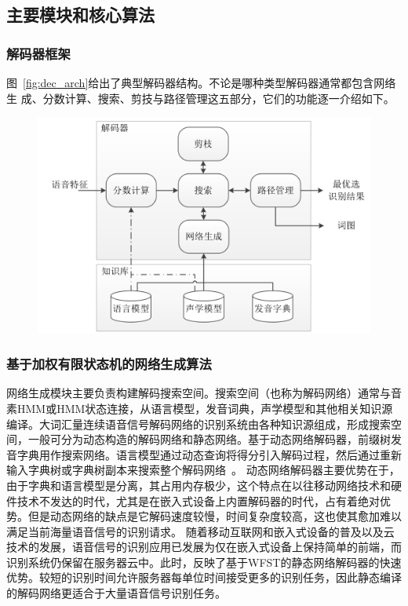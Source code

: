 \subsection{主要模块和核心算法}
\label{chap:intro-lvcsr-decmodule}

\subsubsection{解码器框架}

图~\ref{fig:dec_arch}给出了典型解码器结构。不论是哪种类型解码器通常都包含网络生
成、分数计算、搜索、剪技与路径管理这五部分，它们的功能逐一介绍如下。

\begin{figure}[!htp]
  \centering
    \captionstyle{\centering}
    \includegraphics[clip=true, width=.9\textwidth]{figure/dec_arch.png}
\end{figure}


\subsubsection{基于加权有限状态机的网络生成算法}

网络生成模块主要负责构建解码搜索空间。搜索空间（也称为解码网络）通常与音素HMM或HMM状态连接，从语言模型，发音词典，声学模型和其他相关知识源编译。大词汇量连续语音信号解码网络的识别系统由各种知识源组成，形成搜索空间，一般可分为动态构造的解码网络和静态网络。基于动态网络解码器，前缀树发音字典用作搜索网络。语言模型通过动态查询将得分引入解码过程，然后通过重新输入字典树或字典树副本来搜索整个解码网络~\cite{young2002htk}。
动态网络解码器主要优势在于，由于字典和语言模型是分离，其占用内存极少，这个特点在以往移动网络技术和硬件技术不发达的时代，尤其是在嵌入式设备上内置解码器的时代，占有着绝对优势。但是动态网络的缺点是它解码速度较慢，时间复杂度较高，这也使其愈加难以满足当前海量语音信号的识别请求。
随着移动互联网和嵌入式设备的普及以及云技术的发展，语音信号的识别应用已发展为仅在嵌入式设备上保持简单的前端，而识别系统仍保留在服务器云中。此时，反映了基于WFST的静态网络解码器的快速优势。较短的识别时间允许服务器每单位时间接受更多的识别任务，因此静态编译的解码网络更适合于大量语音信号识别任务。

